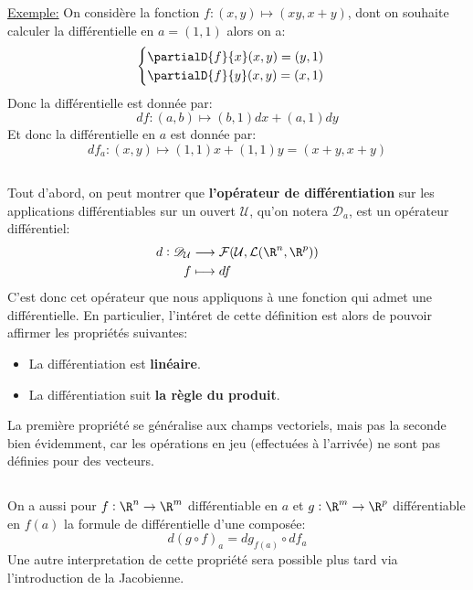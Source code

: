 \underline{Exemple:} On considère la fonction \(f : (x, y) \mapsto (xy, x + y)\), dont on souhaite calculer la différentielle en \(a = (1, 1)\) alors on a:
\[
   \begin{cases}
      \partialD{f}{x}(x, y) = (y, 1)\\
      \partialD{f}{y}(x, y) = (x, 1)
   \end{cases}   
\]
Donc la différentielle est donnée par:
\[
   df : (a, b) \mapsto (b, 1)dx + (a, 1)dy
\]
Et donc la différentielle en \(a\) est donnée par:
\[
   df_a : (x, y) \mapsto (1, 1)x + (1, 1)y = (x + y, x + y)
\]

\subsection*{}
Tout d'abord, on peut montrer que \textbf{l'opérateur de différentiation} sur les applications différentiables sur un ouvert \(\mathcal{U}\), qu'on notera \(\mathscr{D}_a\), est un opérateur différentiel:
\[
   \begin{aligned}
      d : \mathscr{D}_\mathcal{U} &\longrightarrow \mathcal{F}(\mathcal{U}, \mathcal{L}(\R^n, \R^p))\\
      f &\longmapsto df
   \end{aligned}
\]
C'est donc cet opérateur que nous appliquons à une fonction qui admet une différentielle. En particulier, l'intéret de cette définition est alors de pouvoir affirmer les propriétés suivantes:
\begin{itemize}
   \item La différentiation est \textbf{linéaire}.
   \item La différentiation suit \textbf{la règle du produit}.
\end{itemize}
La première propriété se généralise aux champs vectoriels, mais pas la seconde bien évidemment, car les opérations en jeu (effectuées à l'arrivée) ne sont pas définies pour des vecteurs.

\subsection*{}
On a aussi pour \(f : \R^n \rightarrow \R^m\) différentiable en \(a\) et \(g : \R^m \rightarrow \R^p\) différentiable en \(f(a)\) la formule de différentielle d'une composée:
\[
   d(g \circ f)_a = dg_{f(a)} \circ df_a   
\]
Une autre interpretation de cette propriété sera possible plus tard via l'introduction de la Jacobienne.

